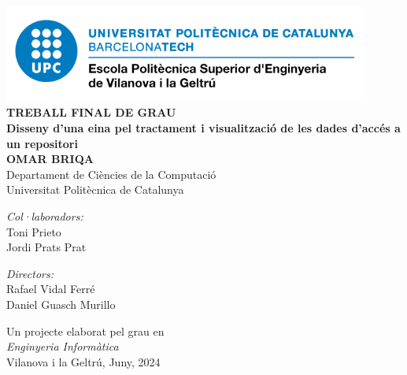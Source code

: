 \begin{titlepage}
    \begin{center}

        \vspace*{-3cm}
        \includegraphics[width=0.9\textwidth]{figures/epsevg-logo} \\ [1cm]

        \huge
        \textbf{TREBALL FINAL DE GRAU} \\ [1cm]

        \huge
        \textbf{Disseny d'una eina pel tractament i visualització de les dades d'accés a un repositori} \\ [1.5cm]

        \LARGE
        \textbf{OMAR BRIQA} \\ [1.5cm]

        \Large
        Departament de Ciències de la Computació \\
        Universitat Politècnica de Catalunya \\ [1cm]

        \begin{minipage}[t]{0.48\textwidth}
            \begin{center}
                \large
                \textit{Col·laboradors:} \\ [0.2cm]
                \Large
                Toni Prieto \\
                Jordi Prats Prat
            \end{center}
        \end{minipage}
        \hfill
        \begin{minipage}[t]{0.48\textwidth}
            \begin{center}
                \large
                \textit{Directors:} \\ [0.2cm]
                \Large
                Rafael Vidal Ferré \\
                Daniel Guasch Murillo
            \end{center}
        \end{minipage}

        \vspace{1.5cm}

        \large
        Un projecte elaborat pel grau en \\ [0.2cm]
        \textit{Enginyeria Informàtica} \\ [0.4cm]
        Vilanova i la Geltrú, Juny, 2024

    \end{center}
\end{titlepage}
